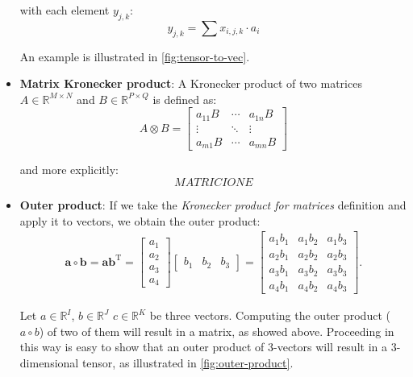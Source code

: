 \begin{itemize}
        with each element $y_{j,k}$: 
        \begin{equation}
            y_{j,k} = \sum x_{i,j,k} \cdot a_i
       \end{equation}
       
       An example is illustrated in \ref{fig:tensor-to-vec}.
        
    \item \textbf{Matrix Kronecker product}: 
       A Kronecker product of two matrices $A \in \mathbb{R}^{M \times N}$ and $B \in \mathbb{R}^{P \times Q}$
       is defined as: 
        \begin{equation} 
        A\otimes B = \begin{bmatrix} a_{11} B & \cdots & a_{1n}B \\ \vdots & \ddots & \vdots \\ a_{m1} B & \cdots & a_{mn} B \end{bmatrix}
        \end{equation}
        
        and more explicitly: %
        $$
        MATRICIONE
        $$
        
    
    \item \textbf{Outer product}: If we take the \emph{Kronecker product for matrices} definition and apply it to vectors, we obtain the outer product: \\
        
        \begin{align}
            \mathbf{a} \circ \mathbf{b} = \mathbf{a} \mathbf{b}^\mathrm{T}
            = \begin{bmatrix}a_1 \\ a_2 \\ a_3 \\ a_4\end{bmatrix}
            \begin{bmatrix}b_1 & b_2 & b_3\end{bmatrix}
            = \begin{bmatrix}a_1b_1 & a_1b_2 & a_1b_3 \\ a_2b_1 & a_2b_2 & a_2b_3 \\ a_3b_1 & a_3b_2 & a_3b_3 \\ a_4b_1 & a_4b_2 & a_4b_3\end{bmatrix}.
        \end{align}

        Let $a \in \mathbb{R}^I$, $b \in \mathbb{R}^J$  $c \in \mathbb{R}^K$ be three vectors. Computing the outer 
        product ($a  \circ  b$) of two of them will result in a matrix, as showed above. Proceeding in this way is easy to show that an outer product of 3-vectors will result in a 3-dimensional tensor, as illustrated in \ref{fig:outer-product}.
        

\end{itemize}
